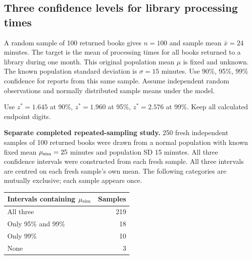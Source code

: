 \subsection{Three confidence levels for library processing times}
\label{prob:c2-compare-three}

A random sample of 100 returned books gives $n=100$ and sample mean $\bar{x}=24$ minutes. The target is the mean of processing times for all books returned to a library during one month. This original population mean $\mu$ is fixed and unknown. The known population standard deviation is $\sigma=15$ minutes. Use 90\%, 95\%, 99\% confidence for reports from this same sample. Assume independent random observations and normally distributed sample means under the model.

Use $z^*=1.645$ at 90\%, $z^*=1.960$ at 95\%, $z^*=2.576$ at 99\%. Keep all calculated endpoint digits.

\textbf{Separate completed repeated-sampling study.} 250 fresh independent samples of 100 returned books were drawn from a normal population with known fixed mean $\mu_{\rm sim}=25$ minutes and population SD 15 minutes. All three confidence intervals were constructed from each fresh sample.
All three intervals are centred on each fresh sample's own mean. The following categories are mutually exclusive; each sample appears once.
\begin{center}\begin{tabular}{@{}lr@{}}\toprule
Intervals containing $\mu_{\rm sim}$ & Samples\\\midrule
All three & 219 \\[6pt]
Only 95\% and 99\% & 18 \\[6pt]
Only 99\% & 10 \\[6pt]
None & 3 \\[6pt]
\bottomrule\end{tabular}\end{center}

